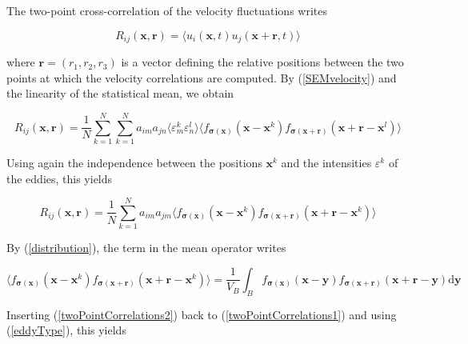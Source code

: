 \noindent The two-point cross-correlation of the velocity fluctuations writes

\begin{equation} \label{twoPointCorrelations0}
R_{ij}(\boldsymbol{x},\boldsymbol{r}) = \langle u_i(\boldsymbol{x},t) u_j(\boldsymbol{x}+\boldsymbol{r},t) \rangle
\end{equation}

\noindent where $\boldsymbol{r} = (r_1,r_2,r_3)$ is a vector defining the relative positions between the two points at which the velocity correlations are computed. By (\ref{SEMvelocity}) and the linearity of the statistical mean, we obtain

\begin{equation}
R_{ij}(\boldsymbol{x},\boldsymbol{r}) = \frac{1}{N}\sum_{k=1}^N\sum_{k=1}^N a_{im}a_{jn} \langle \varepsilon_m^k \varepsilon_n^l \rangle \langle f_{\boldsymbol{\sigma}(\boldsymbol{x})}(\boldsymbol{x}-\boldsymbol{x}^k) f_{\boldsymbol{\sigma}(\boldsymbol{x}+\boldsymbol{r})}(\boldsymbol{x}+\boldsymbol{r}-\boldsymbol{x}^l) \rangle 
\end{equation}

\noindent Using again the independence between the positions $\boldsymbol{x}^k$ and the intensities $\varepsilon^k$ of the eddies, this yields

\begin{equation} \label{twoPointCorrelations1}
R_{ij}(\boldsymbol{x},\boldsymbol{r}) = \frac{1}{N}\sum_{k=1}^N a_{im}a_{jm} \langle f_{\boldsymbol{\sigma}(\boldsymbol{x})}(\boldsymbol{x}-\boldsymbol{x}^k) f_{\boldsymbol{\sigma}(\boldsymbol{x}+\boldsymbol{r})}(\boldsymbol{x}+\boldsymbol{r}-\boldsymbol{x}^k) \rangle 
\end{equation}

\noindent By (\ref{distribution}), the term in the mean operator writes

\begin{equation} \label{twoPointCorrelations2}
\langle f_{\boldsymbol{\sigma}(\boldsymbol{x})}(\boldsymbol{x}-\boldsymbol{x}^k) f_{\boldsymbol{\sigma}(\boldsymbol{x}+\boldsymbol{r})}(\boldsymbol{x}+\boldsymbol{r}-\boldsymbol{x}^k) \rangle = \frac{1}{V_B} \int_B f_{\boldsymbol{\sigma}(\boldsymbol{x})}(\boldsymbol{x}-\boldsymbol{y}) f_{\boldsymbol{\sigma}(\boldsymbol{x}+\boldsymbol{r})}(\boldsymbol{x}+\boldsymbol{r}-\boldsymbol{y}) \mathrm{d}\boldsymbol{y}
\end{equation}

\noindent Inserting (\ref{twoPointCorrelations2}) back to (\ref{twoPointCorrelations1}) and using (\ref{eddyType}), this yields

